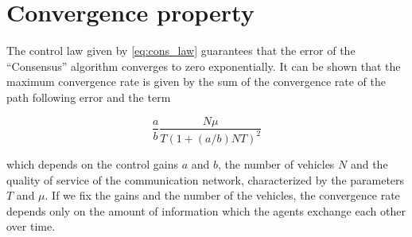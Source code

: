 \section{Convergence property\label{sec:convergence_property}}

The control law given by \eqref{eq:cons_law} guarantees that the error of the
“Consensus” algorithm converges to zero exponentially.
It can be shown that the maximum convergence rate is given by the sum of
the convergence rate of the path following error and the term

\begin{equation}
  \frac{a}{b} \frac{N \mu}{T ( 1 + (a / b) N T)^2}
\end{equation}

which depends on the control gains $a$ and $b$, the number of vehicles $N$ and
the quality of service of the communication network, characterized by the parameters
$T$ and $\mu$.
If we fix the gains and the number of the vehicles, the convergence rate depends
only on the amount of information which the agents exchange each other over time.
